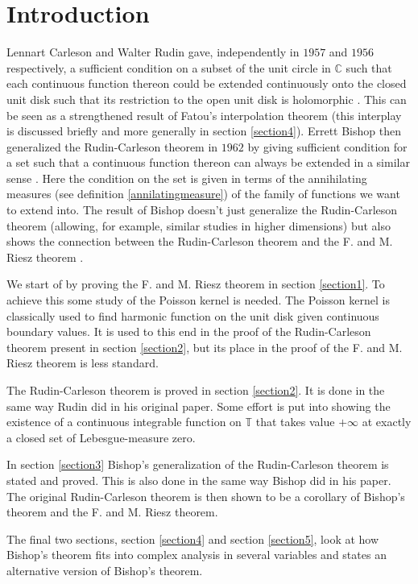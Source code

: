 \documentclass[a4paper,12pt,twoside,BCOR=10mm]{scrbook}
\theoremstyle{definition}
\theoremstyle{definition}
\theoremstyle{definition}
\begin{document}
\chapter{Introduction}
Lennart Carleson and Walter Rudin gave, independently in $1957$ and $1956$ respectively, a sufficient condition on a subset of the unit circle in $\mathbb{C}$ such that each continuous function thereon could be extended continuously onto the closed unit disk such that its restriction to the open unit disk is holomorphic \citep{rudin, carleson}.
This can be seen as a strengthened result of Fatou's interpolation theorem \citep{fatou} (this interplay is discussed briefly and more generally in section \ref{section4}).
Errett Bishop then generalized the Rudin-Carleson theorem in $1962$ by giving sufficient condition for a set such that a continuous function thereon can always be extended in a similar sense \citep{bishop}.
Here the condition on the set is given in terms of the annihilating measures (see definition \ref{annilatingmeasure}) of the family of functions we want to extend into.
The result of Bishop doesn't just generalize the Rudin-Carleson theorem (allowing, for example, similar studies in higher dimensions) but also shows the connection between the Rudin-Carleson theorem and the F. and M. Riesz theorem \citep{fandmriesz}.

We start of by proving the F. and M. Riesz theorem in section \ref{section1}.
To achieve this some study of the Poisson kernel is needed.
The Poisson kernel is classically used to find harmonic function on the unit disk given continuous boundary values.
It is used to this end in the proof of the Rudin-Carleson theorem present in section \ref{section2}, but its place in the proof of the F. and M. Riesz theorem is less standard.

The Rudin-Carleson theorem is proved in section \ref{section2}.
It is done in the same way Rudin did in his original paper.
Some effort is put into showing the existence of a continuous integrable function on $\mathbb{T}$ that takes value $+\infty$ at exactly a closed set of Lebesgue-measure zero.

In section \ref{section3} Bishop's generalization of the Rudin-Carleson theorem is stated and proved.
This is also done in the same way Bishop did in his paper.
The original Rudin-Carleson theorem is then shown to be a corollary of Bishop's theorem and the F. and M. Riesz theorem.

The final two sections, section \ref{section4} and section \ref{section5}, look at how Bishop's theorem fits into complex analysis in several variables and states an alternative version of Bishop's theorem.
\end{document}
